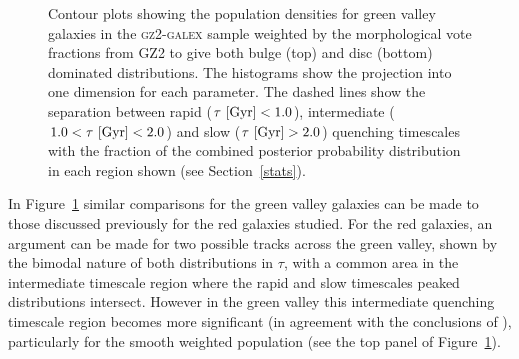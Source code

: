 \begin{figure}
\caption[Population densities of green smooth and disc galaxies]{Contour plots showing the population densities for green valley galaxies in the \textsc{gz2-galex} sample weighted by the morphological vote fractions from GZ2 to give both bulge (top) and disc (bottom) dominated distributions. The histograms show the projection into one dimension for each parameter. The dashed lines show the separation between rapid ($\tau ~\rm{[Gyr]} < 1.0$), intermediate ($1.0 < \tau ~\rm{[Gyr]} < 2.0$) and slow ($\tau ~\rm{[Gyr]} > 2.0$) quenching timescales with the fraction of the combined posterior probability distribution in each region shown (see Section~\ref{stats}).}
\label{green_v}
\end{figure}

In Figure~\ref{green_v} similar comparisons for the green valley galaxies can be made to those discussed previously for the red galaxies studied. For the red galaxies, an argument can be made for two possible tracks across the green valley, shown by the bimodal nature of both distributions in $\tau$, with a common area in the intermediate timescale region where the rapid and slow timescales peaked distributions intersect. However in the green valley this intermediate quenching timescale region becomes more significant  (in agreement with the conclusions of \citealt{Gonc12}), particularly for the smooth weighted population (see the top panel of Figure~\ref{green_v}).

